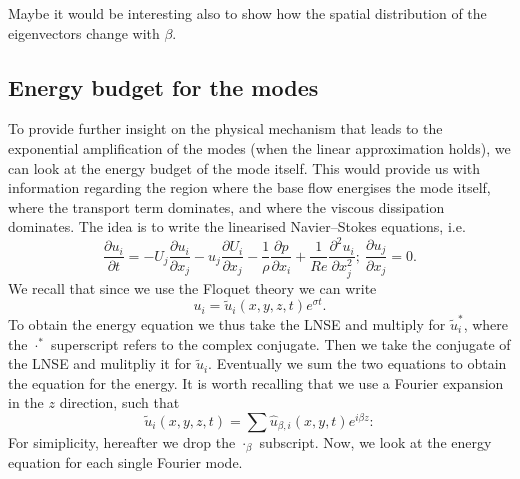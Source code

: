 Maybe it would be interesting also to show how the spatial distribution of the eigenvectors change with $\beta$.

\subsection{Energy budget for the modes}

To provide further insight on the physical mechanism that leads to the exponential amplification of the modes (when the linear approximation holds), we can look at the energy budget of the mode itself. This would provide us with information regarding the region where the base flow energises the mode itself, where the transport term dominates, and where the viscous dissipation dominates. The idea is to write the linearised Navier--Stokes equations, i.e.
%
\begin{equation}
  \frac{\partial u_i}{\partial t}  = - U_j \frac{\partial u_i}{\partial x_j} - u_j \frac{\partial U_i}{\partial x_j} - \frac{1}{\rho}\frac{\partial p}{\partial x_i} + \frac{1}{Re} \frac{\partial^2 u_i}{\partial x_j^2}; \ \frac{\partial u_j}{\partial x_j} = 0.
\end{equation}
We recall that since we use the Floquet theory we can write
%
\begin{equation}
  u_i = \tilde{u}_i(x,y,z,t) e^{\sigma t}.
\end{equation}
%
To obtain the energy equation we thus take the LNSE and multiply for $\tilde{u}_i^*$, where the $\cdot^*$ superscript refers to the complex conjugate. Then we take the conjugate of the LNSE and mulitpliy it for $\tilde{u}_i$. Eventually we sum the two equations to obtain the equation for the energy.
It is worth recalling that we use a Fourier expansion in the $z$ direction, such that
%
\begin{equation}
  \tilde{u}_i(x,y,z,t) = \sum \hat{u}_{\beta,i}(x,y,t) e^{i\beta z}:
\end{equation}
%
For simiplicity, hereafter we drop the $\cdot_\beta$ subscript.
Now, we look at the energy equation for each single Fourier mode.

